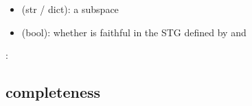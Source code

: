 \documentclass[letterpaper,10pt,english]{sphinxmanual}
\begin{document}
\begin{fulllineitems}
\begin{description}
\begin{itemize}
\item {} 
 (str / dict): a subspace

\end{itemize}

\item[{\sphinxstylestrong{returns}:}] \leavevmode\begin{itemize}
\item {} 
 (bool): whether  is faithful in the STG defined by  and 

\end{itemize}

\end{description}

:

\begin{sphinxVerbatim}[commandchars=\\\{\}]
   
  \PYG{p}{[}\PYG{p}{]}
 
\end{sphinxVerbatim}

\end{fulllineitems}



\subsection{completeness}
\label{\detokenize{Attractors:id6}}\label{\detokenize{Attractors:completeness}}
\end{document}
